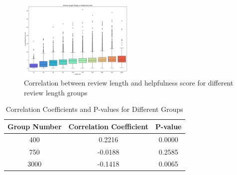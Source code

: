 \begin{figure}[H]
    \centering
    \includegraphics[width=0.49\textwidth]{./figures/h1_boxplot.png}
    \caption{Correlation between review length and helpfulness score for different review length groups}
    \label{fig:h1_boxplot}
\end{figure}

\begin{table}[H]
    \centering
    \caption{Correlation Coefficients and P-values for Different Groups}
    \begin{tabular}{|c|c|c|}
    \hline
    Group Number & Correlation Coefficient & P-value \\
    \hline
    400 & 0.2216 & 0.0000 \\
    \hline
    750 & -0.0188 & 0.2585 \\
    \hline
    3000 & -0.1418 & 0.0065 \\
    \hline
    \end{tabular}
    \end{table}
\label{corr_groups}
